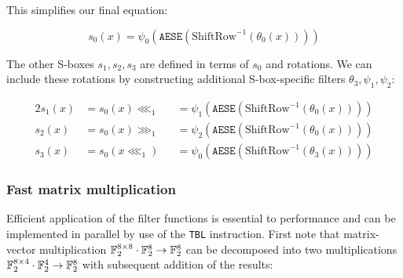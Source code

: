 This simplifies our final equation:

\[
    s_0(x)=\psi_0(\texttt{AESE}(\text{ShiftRow}^{-1}(\theta_0(x))))
\]

The other S-boxes $s_1,s_2,s_3$ are defined in terms of $s_0$ and rotations. We
can include these rotations by constructing additional S-box-specific filters
$\theta_3,\psi_1,\psi_2$:

\begin{alignat*}{2}
    s_1(x)&=s_0(x)\lll_1&&=\psi_1(\texttt{AESE}(\text{ShiftRow}^{-1}(\theta_0(x)))) \\
    s_2(x)&=s_0(x)\ggg_1&&=\psi_2(\texttt{AESE}(\text{ShiftRow}^{-1}(\theta_0(x)))) \\
    s_3(x)&=s_0(x\lll_1)&&=\psi_0(\texttt{AESE}(\text{ShiftRow}^{-1}(\theta_3(x))))
\end{alignat*}

\subsubsection{Fast matrix multiplication}

Efficient application of the filter functions is essential to performance and
can be implemented in parallel by use of the \texttt{TBL} instruction. First
note that matrix-vector multiplication $\mathbb{F}_2^{8\times 8}\cdot\mathbb{F}_2^{8}\rightarrow
\mathbb{F}_2^{8}$ can be decomposed into two multiplications $\mathbb{F}_2^{8\times
4}\cdot\mathbb{F}_2^{4}\rightarrow \mathbb{F}_2^{8}$ with subsequent addition of the results:

